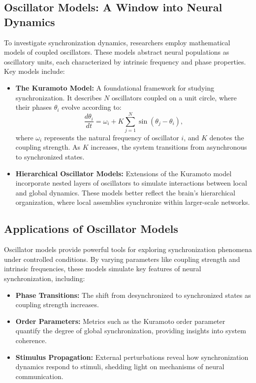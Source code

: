 \subsection*{Oscillator Models: A Window into Neural Dynamics}

To investigate synchronization dynamics, researchers employ mathematical models of coupled oscillators. These models abstract neural populations as oscillatory units, each characterized by intrinsic frequency and phase properties. Key models include:

\begin{itemize}
    \item \textbf{The Kuramoto Model:} A foundational framework for studying synchronization. It describes $N$ oscillators coupled on a unit circle, where their phases $\theta_i$ evolve according to:
    \begin{equation}
    \frac{d\theta_i}{dt} = \omega_i + K \sum_{j=1}^N \sin(\theta_j - \theta_i),
    \end{equation}
    where $\omega_i$ represents the natural frequency of oscillator $i$, and $K$ denotes the coupling strength. As $K$ increases, the system transitions from asynchronous to synchronized states.

    \item \textbf{Hierarchical Oscillator Models:} Extensions of the Kuramoto model incorporate nested layers of oscillators to simulate interactions between local and global dynamics. These models better reflect the brain’s hierarchical organization, where local assemblies synchronize within larger-scale networks.
\end{itemize}

\subsection*{Applications of Oscillator Models}

Oscillator models provide powerful tools for exploring synchronization phenomena under controlled conditions. By varying parameters like coupling strength and intrinsic frequencies, these models simulate key features of neural synchronization, including:

\begin{itemize}
    \item \textbf{Phase Transitions:} The shift from desynchronized to synchronized states as coupling strength increases.
    \item \textbf{Order Parameters:} Metrics such as the Kuramoto order parameter quantify the degree of global synchronization, providing insights into system coherence.
    \item \textbf{Stimulus Propagation:} External perturbations reveal how synchronization dynamics respond to stimuli, shedding light on mechanisms of neural communication.
\end{itemize}

